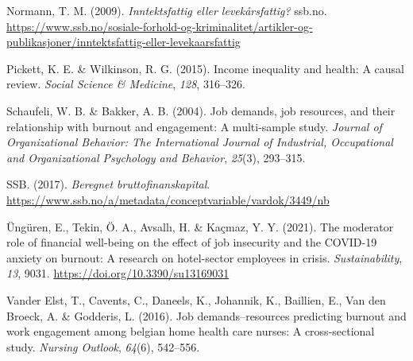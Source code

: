 \documentclass[
  12pt,
  a4paper,
  DIV=11,
  numbers=noendperiod]{scrartcl}
\newlength{\cslhangindent}
\newenvironment{CSLReferences}[2] %
 {\begin{list}{}{%
  \setlength{\itemindent}{0pt}
  \setlength{\leftmargin}{0pt}
  \setlength{\parsep}{0pt}
  \ifodd #1
   \setlength{\leftmargin}{\cslhangindent}
   \setlength{\itemindent}{-1\cslhangindent}
  \fi
  \setlength{\itemsep}{#2\baselineskip}}}
 {\end{list}}
\begin{document}
\begin{CSLReferences}{1}{0}
Normann, T. M. (2009). \emph{Inntektsfattig eller levekårsfattig?}
ssb.no.
\url{https://www.ssb.no/sosiale-forhold-og-kriminalitet/artikler-og-publikasjoner/inntektsfattig-eller-levekaarsfattig}

Pickett, K. E. \& Wilkinson, R. G. (2015). Income inequality and health:
A causal review. \emph{Social Science \& Medicine}, \emph{128},
316--326.

Schaufeli, W. B. \& Bakker, A. B. (2004). Job demands, job resources,
and their relationship with burnout and engagement: A multi-sample
study. \emph{Journal of Organizational Behavior: The International
Journal of Industrial, Occupational and Organizational Psychology and
Behavior}, \emph{25}(3), 293--315.

SSB. (2017). \emph{Beregnet bruttofinanskapital}.
\url{https://www.ssb.no/a/metadata/conceptvariable/vardok/3449/nb}

Üngüren, E., Tekin, Ö. A., Avsallı, H. \& Kaçmaz, Y. Y. (2021). The
moderator role of financial well-being on the effect of job insecurity
and the COVID-19 anxiety on burnout: A research on hotel-sector
employees in crisis. \emph{Sustainability}, \emph{13}, 9031.
\url{https://doi.org/10.3390/su13169031}

Vander Elst, T., Cavents, C., Daneels, K., Johannik, K., Baillien, E.,
Van den Broeck, A. \& Godderis, L. (2016). Job demands--resources
predicting burnout and work engagement among belgian home health care
nurses: A cross-sectional study. \emph{Nursing Outlook}, \emph{64}(6),
542--556.

\end{CSLReferences}
\end{document}

